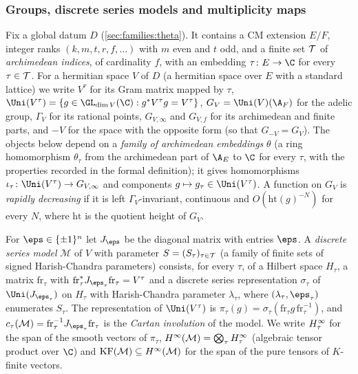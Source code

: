 \subsubsection{Groups, discrete series models and multiplicity maps}

Fix a global datum $D$ (\cref{sec:families:theta}). It contains a CM extension $E/F$, integer ranks $(k,m,t,r,f,\dots)$ with
$m$ even and $t$ odd, and a finite set $\mathcal T$ of \emph{archimedean indices}, of cardinality $f$, with an embedding
$\tau\colon E\to\C$ for every $\tau\in\mathcal T$. For a hermitian space $V$ of $D$ (a hermitian space over $E$ with a standard
lattice) we write $V^\tau$ for its Gram matrix mapped by $\tau$, $\Uni(V^\tau)=\{g\in\GL_{\dim V}(\C):g^*V^\tau g=V^\tau\}$,
$G_V=\Uni(V)(\A_F)$ for the adelic group, $\Gamma_V$ for its rational points, $G_{V,\infty}$ and $G_{V,f}$ for its archimedean
and finite parts, and $-V$ for the space with the opposite form (so that $G_{-V}=G_V$). The objects below depend on a
\emph{family of archimedean embeddings} $\theta$ (a ring homomorphism $\theta_\tau$ from the archimedean part of $\A_E$ to
$\C$ for every $\tau$, with the properties recorded in the formal definition); it gives homomorphisms
$\iota_\tau\colon\Uni(V^\tau)\to G_{V,\infty}$ and components $g\mapsto g_\tau\in\Uni(V^\tau)$. A function on $G_V$ is
\emph{rapidly decreasing} if it is left $\Gamma_V$-invariant, continuous and $O(\mathrm{ht}(g)^{-N})$ for every $N$,
where $\mathrm{ht}$ is the quotient height of $G_V$.

For $\eps\in\{\pm1\}^n$ let $J_\eps$ be the diagonal matrix with entries $\eps$. A \emph{discrete series model}
$\mathcal M$ of $V$ with parameter $S=(S_\tau)_{\tau\in\mathcal T}$ (a family of finite sets of signed Harish-Chandra
parameters) consists, for every $\tau$, of a Hilbert space $H_\tau$, a matrix $\mathrm{fr}_\tau$ with
$\mathrm{fr}_\tau^*J_{\eps_\tau}\mathrm{fr}_\tau=V^\tau$ and a discrete series representation $\sigma_\tau$ of
$\Uni(J_{\eps_\tau})$ on $H_\tau$ with Harish-Chandra parameter $\lambda_\tau$, where $(\lambda_\tau,\eps_\tau)$ enumerates
$S_\tau$. The representation of $\Uni(V^\tau)$ is $\pi_\tau(g)=\sigma_\tau(\mathrm{fr}_\tau g\,\mathrm{fr}_\tau^{-1})$, and
$c_\tau(\mathcal M)=\mathrm{fr}_\tau^{-1}J_{\eps_\tau}\mathrm{fr}_\tau$ is the \emph{Cartan involution} of the model. We write
$H^{\infty}_\tau$ for the span of the smooth vectors of $\pi_\tau$, $H^{\infty}(\mathcal M)=\bigotimes_\tau H^{\infty}_\tau$ (algebraic tensor
product over $\C$) and $\mathrm{KF}(\mathcal M)\subseteq H^{\infty}(\mathcal M)$ for the span of the pure tensors of $K$-finite vectors.


